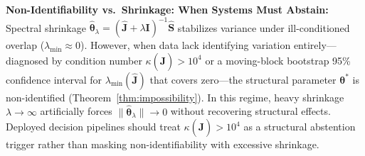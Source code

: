 \documentclass[twoside]{article}
\theoremstyle{definition}
\begin{document}
\textbf{Non-Identifiability vs.\ Shrinkage: When Systems Must Abstain:}
Spectral shrinkage $\hat{\boldsymbol{\theta}}_\lambda = (\hat{\boldsymbol{J}} + \lambda \boldsymbol{I})^{-1}\hat{\boldsymbol{S}}$ stabilizes variance under ill-conditioned overlap ($\lambda_{\min} \approx 0$). However, when data lack identifying variation entirely—diagnosed by condition number $\kappa(\hat{\boldsymbol{J}}) > 10^4$ or a moving-block bootstrap 95\% confidence interval for $\lambda_{\min}(\hat{\boldsymbol{J}})$ that covers zero—the structural parameter $\boldsymbol{\theta}^*$ is non-identified (Theorem~\ref{thm:impossibility}). In this regime, heavy shrinkage $\lambda \to \infty$ artificially forces $\|\hat{\boldsymbol{\theta}}_\lambda\| \to 0$ without recovering structural effects. Deployed decision pipelines should treat $\kappa(\hat{\boldsymbol{J}}) > 10^4$ as a structural abstention trigger rather than masking non-identifiability with excessive shrinkage.

\vspace{-2mm}
\end{document}
